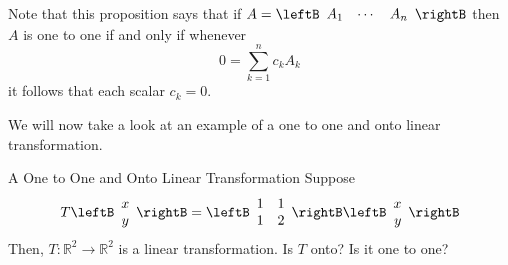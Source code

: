 Note that this proposition says that if $A=\leftB
\begin{array}{ccc}
A_{1} & \cdots & A_{n}
\end{array}
\rightB $ then $A$ is one to one if and only if whenever
\begin{equation*}
0 = \sum_{k=1}^{n}c_{k}A_{k}
\end{equation*}
it follows that each scalar $c_{k}=0$. 

We will now take a look at an example of a one to one and onto linear transformation. 

\begin{example}{A One to One and Onto Linear Transformation}\label{exa:onetooneontolineartransformation}
Suppose
\begin{equation*}
T\leftB
\begin{array}{c}
x \\
y
\end{array}
\rightB =\leftB
\begin{array}{rr}
1 & 1 \\
1 & 2
\end{array}
\rightB \leftB
\begin{array}{r}
x \\
y
\end{array}
\rightB
\end{equation*}
Then, $T:\mathbb{R}^{2}\rightarrow \mathbb{R}^{2}$ is a linear
transformation. Is $T$ onto? Is it one to one?
\end{example}

